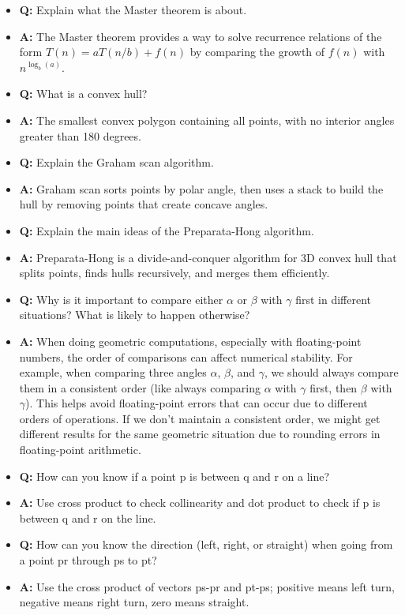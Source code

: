 \documentclass[11pt,a4paper]{article}
\begin{document}
\begin{multicols}{2}
\begin{itemize}
    \item \textbf{Q:} Explain what the Master theorem is about.
    \item \textbf{A:} The Master theorem provides a way to solve recurrence relations of the form $T(n) = aT(n/b) + f(n)$ by comparing the growth of $f(n)$ with $n^{\log_b(a)}$.

    \item \textbf{Q:} What is a convex hull?
    \item \textbf{A:} The smallest convex polygon containing all points, with no interior angles greater than 180 degrees.

    \item \textbf{Q:} Explain the Graham scan algorithm.
    \item \textbf{A:} Graham scan sorts points by polar angle, then uses a stack to build the hull by removing points that create concave angles.

    \item \textbf{Q:} Explain the main ideas of the Preparata-Hong algorithm.
    \item \textbf{A:} Preparata-Hong is a divide-and-conquer algorithm for 3D convex hull that splits points, finds hulls recursively, and merges them efficiently.

    \item \textbf{Q:} Why is it important to compare either $\alpha$ or $\beta$ with $\gamma$ first in different situations? What is likely to happen otherwise?
    \item \textbf{A:} When doing geometric computations, especially with floating-point numbers, the order of comparisons can affect numerical stability. For example, when comparing three angles $\alpha$, $\beta$, and $\gamma$, we should always compare them in a consistent order (like always comparing $\alpha$ with $\gamma$ first, then $\beta$ with $\gamma$). This helps avoid floating-point errors that can occur due to different orders of operations. If we don't maintain a consistent order, we might get different results for the same geometric situation due to rounding errors in floating-point arithmetic.

    \item \textbf{Q:} How can you know if a point p is between q and r on a line?
    \item \textbf{A:} Use cross product to check collinearity and dot product to check if p is between q and r on the line.

    \item \textbf{Q:} How can you know the direction (left, right, or straight) when going from a point pr through ps to pt?
    \item \textbf{A:} Use the cross product of vectors ps-pr and pt-ps; positive means left turn, negative means right turn, zero means straight.


\end{itemize}
\end{multicols}
\end{document}
